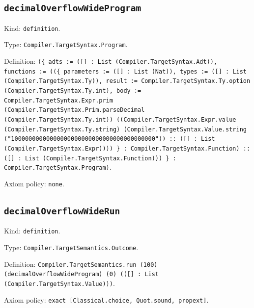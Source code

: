 \documentclass[11pt]{article}
\begin{document}
\subsection*{\texttt{decimalOverflowWideProgram}}
\noindent Kind: \texttt{definition}.\par
\noindent Type: \texttt{Compiler.TargetSyntax.Program}.\par
\noindent Definition: \texttt{(\{ adts := ([] : List (Compiler.TargetSyntax.Adt)), functions := ((\{ parameters := ([] : List (Nat)), types := ([] : List (Compiler.TargetSyntax.Ty)), result := Compiler.TargetSyntax.Ty.option (Compiler.TargetSyntax.Ty.int), body := Compiler.TargetSyntax.Expr.prim (Compiler.TargetSyntax.Prim.parseDecimal (Compiler.TargetSyntax.Ty.int)) ((Compiler.TargetSyntax.Expr.value (Compiler.TargetSyntax.Ty.string) (Compiler.TargetSyntax.Value.string ("10000000000000000000000000000000000000000")) :: ([] : List (Compiler.TargetSyntax.Expr)))) \} : Compiler.TargetSyntax.Function) :: ([] : List (Compiler.TargetSyntax.Function))) \} : Compiler.TargetSyntax.Program)}.\par
\noindent Axiom policy: \texttt{none}.\par
\subsection*{\texttt{decimalOverflowWideRun}}
\noindent Kind: \texttt{definition}.\par
\noindent Type: \texttt{Compiler.TargetSemantics.Outcome}.\par
\noindent Definition: \texttt{Compiler.TargetSemantics.run (100) (decimalOverflowWideProgram) (0) (([] : List (Compiler.TargetSyntax.Value)))}.\par
\noindent Axiom policy: \texttt{exact [Classical.choice, Quot.sound, propext]}.\par
\end{document}
